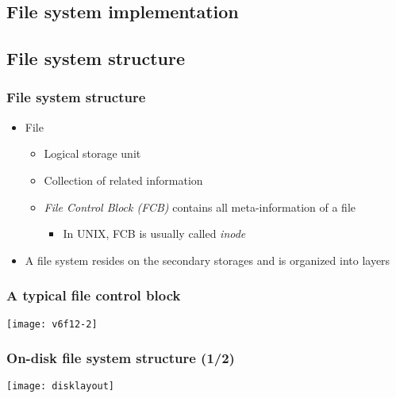 \documentclass[CJKutf8,dvipsnames,table]{beamer}
\begin{document}
\begin{CJK*}{UTF8}{song}
  \section{File system implementation}

  \subsection{File system structure}

  \begin{frame}
    \frametitle{File system structure} \pause
    \begin{itemize}\parskip=0pt
    \item File \pause
      \begin{itemize}\parskip=0pt
      \item Logical storage unit \pause
      \item Collection of related information \pause
      \item \emph{File Control Block (FCB)} contains all meta-information of a file \pause
        \begin{itemize}\parskip=0pt
        \item In UNIX, FCB is usually called \emph{inode} \pause
        \end{itemize}
      \end{itemize}
    \item A file system resides on the secondary storages and is organized into layers
    \end{itemize}
  \end{frame}

\iffalse
  \begin{frame}
    \frametitle{Layered File system} \pause
    \begin{center}
      \texttt{[image: v6f12-1]}
    \end{center}
  \end{frame}
\fi
  
  \begin{frame}
    \frametitle{A typical file control block} \pause
    \begin{center}
      \texttt{[image: v6f12-2]}
    \end{center}
  \end{frame}
  
  \begin{frame}
    \frametitle{On-disk file system structure (1/2)} \pause
    \begin{center}
      \texttt{[image: disklayout]}
    \end{center}
  \end{frame}
  

\end{CJK*}
\end{document}
